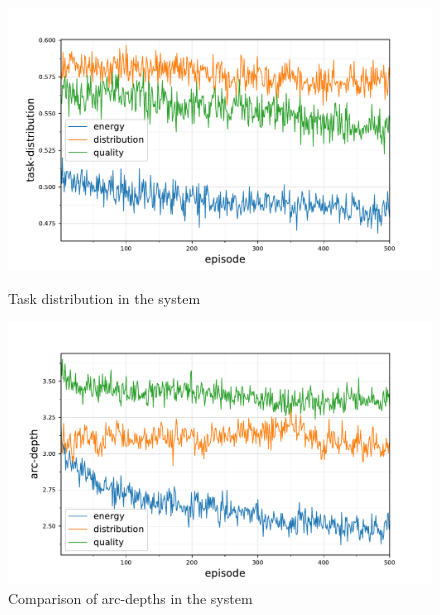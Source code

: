 \begin{figure}[ht]
	\begin{minipage}{.49\textwidth}
		\centering
		\includegraphics[width=1.0\linewidth,trim={25pt 0pt 50pt 0pt},clip]{5.19_ctv-task-distribution-comparison}
		\caption{Task distribution in the \simulationExtended{}{} \newline system}
		\label{fig:ctv-task-distribution-comparison}
	\end{minipage}\hfill%
	\begin{minipage}{.49\textwidth}
		\centering
		\includegraphics[width=1.0\linewidth,trim={25pt 0pt 50pt 0pt},clip]{5.19_ctv-arc-depth-comparison}
		\caption{Comparison of arc-depths in the \simulationExtended{}{} \newline system}
		\label{fig:ctv-arc-depth-comparison}
	\end{minipage}
\end{figure}
